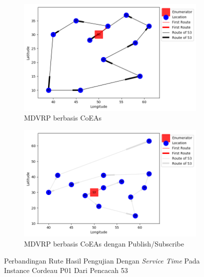 \begin{figure}[H]
	\centering
	\begin{subfigure}[t]{\textwidth}
		\centering
		\includegraphics[width=\textwidth]{Resources/Images/cordeau_p01_tw/cordeau_p01_tw_53_coes}
		\caption{MDVRP berbasis CoEAs}
		\label{fig:cordeau_p01_tw_53_coes}
	\end{subfigure}
	\begin{subfigure}[t]{\textwidth}
		\centering
		\includegraphics[width=\textwidth]{Resources/Images/cordeau_p01_tw/cordeau_p01_tw_53_pubsub_coes}
		\caption{MDVRP berbasis CoEAs dengan Publish/Subscribe}
		\label{fig:cordeau_p01_tw_53_pubsub_coes}
	\end{subfigure}
	\caption{Perbandingan Rute Hasil Pengujian Dengan \textit{Service Time} Pada Instance Cordeau P01 Dari Pencacah 53}
	\label{fig:cordeau_p01_tw_53}
\end{figure}


